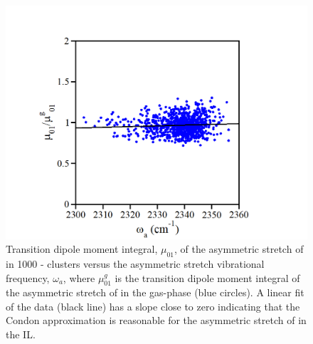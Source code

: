 \documentclass[%
  class = book,%
  crop = false,%
  float = true,%
  multi = true,%
  preview = false,%
]{standalone}
\begin{document}
\begin{figure}
  \centering
  \includegraphics[width=\textwidth]{figure3.png}
  \caption[Correlation between \(\mu_{01}\) and \(\tilde{\nu}_{3}\)]{Transition dipole moment integral, \(\mu_{01}\), of the asymmetric stretch of  in 1000 -\ce{[C4C1im][PF6]} clusters versus the asymmetric stretch vibrational frequency, \(\omega_{a}\), where \(\mu_{01}^{g}\) is the transition dipole moment integral of the asymmetric stretch of  in the gas-phase (blue circles). A linear fit of the data (black line) has a slope close to zero indicating that the Condon approximation is reasonable for the asymmetric stretch of  in the \ce{[C4C1im][PF6]} IL.}
  \label{paper_03:fig3}
\end{figure}
\end{document}
